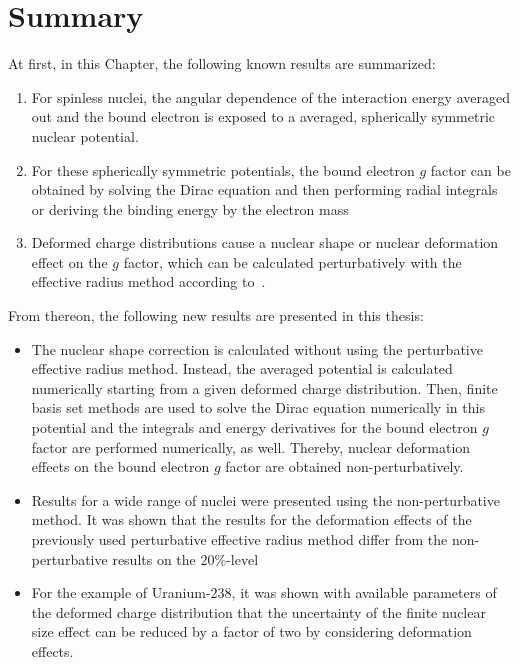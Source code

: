 \section{Summary}
At first, in this Chapter, the following known results are summarized:
\begin{enumerate}
\item For spinless nuclei, the angular dependence of the interaction energy averaged out and the bound electron is exposed to a averaged, spherically symmetric nuclear potential.
\item For these spherically symmetric potentials, the bound electron $g$ factor can be obtained by solving the Dirac equation and then performing radial integrals or deriving the binding energy by the electron mass
\item Deformed charge distributions cause a nuclear shape or nuclear deformation effect on the $g$ factor, which can be calculated perturbatively with the effective radius method according to~\cite{jacek2012}.
\end{enumerate}
From thereon, the following new results are presented in this thesis:
\begin{itemize}
\item The nuclear shape correction is calculated without using the perturbative effective radius method. Instead, the averaged potential is calculated numerically starting from a given deformed charge distribution. Then, finite basis set methods are used to solve the Dirac equation numerically in this potential and the integrals and energy derivatives for the bound electron $g$ factor are performed numerically, as well. Thereby, nuclear deformation effects on the bound electron $g$ factor are obtained non-perturbatively.
\item Results for a wide range of nuclei were presented using the non-perturbative method. It was shown that the results for the deformation effects of the previously used perturbative effective radius method differ from the non-perturbative results on the $20\%$-level
\item For the example of Uranium-238, it was shown with available parameters of the deformed charge distribution that the uncertainty of the finite nuclear size effect can be reduced by a factor of two by considering deformation effects. 
\end{itemize}

